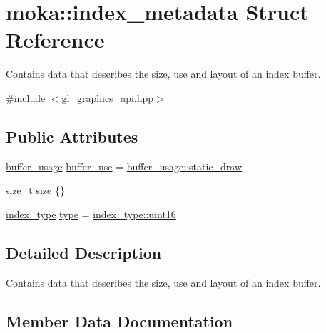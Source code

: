 \hypertarget{structmoka_1_1index__metadata}{}\section{moka\+::index\+\_\+metadata Struct Reference}
\label{structmoka_1_1index__metadata}


Contains data that describes the size, use and layout of an index buffer.  




{\ttfamily \#include $<$gl\+\_\+graphics\+\_\+api.\+hpp$>$}

\subsection*{Public Attributes}
\begin{DoxyCompactItemize}
\item 
\mbox{\hyperlink{namespacemoka_a4799e695da8b173f75809387af8abed7}{buffer\+\_\+usage}} \mbox{\hyperlink{structmoka_1_1index__metadata_a666fdbea978e76facd234b66bc442c5b}{buffer\+\_\+use}} = \mbox{\hyperlink{namespacemoka_a4799e695da8b173f75809387af8abed7a189a433f29705bbe60128483495ddfd9}{buffer\+\_\+usage\+::static\+\_\+draw}}
\item 
size\+\_\+t \mbox{\hyperlink{structmoka_1_1index__metadata_a496fdc79a8d79892d3e673fbf9e1cbea}{size}} \{\}
\item 
\mbox{\hyperlink{namespacemoka_a32244b0de63481283738e2db11639e3f}{index\+\_\+type}} \mbox{\hyperlink{structmoka_1_1index__metadata_aa38931c3e20da32eb67833ca691c8473}{type}} = \mbox{\hyperlink{namespacemoka_a32244b0de63481283738e2db11639e3faa00ef2ef85ff67b7b39339886f19044f}{index\+\_\+type\+::uint16}}
\end{DoxyCompactItemize}


\subsection{Detailed Description}
Contains data that describes the size, use and layout of an index buffer. 

\subsection{Member Data Documentation}
\mbox{\label{structmoka_1_1index__metadata_a666fdbea978e76facd234b66bc442c5b}} 
